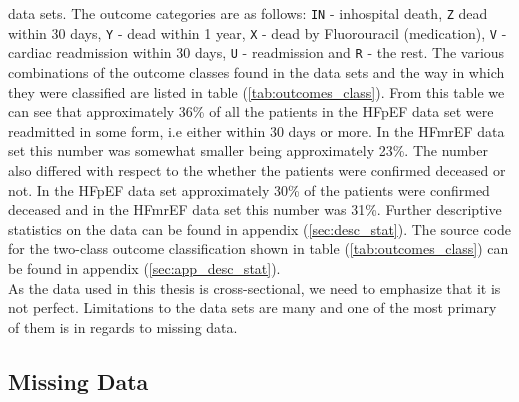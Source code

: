 \documentclass[../thesis.tex]{subfiles}
\begin{document}
\noindent data sets. The outcome categories are as follows: \texttt{IN} - inhospital death, \texttt{Z} \noindent dead within 30 days, \texttt{Y} - dead within 1 year, \texttt{X} - dead by Fluorouracil (medication), \texttt{V} - cardiac readmission within 30 days, \texttt{U} - readmission and \texttt{R} - the rest. The various combinations of the outcome classes found in the data sets and the way in which they were classified are listed in table (\ref{tab:outcomes_class}). From this table we can see that approximately 36\% of all the patients in the HFpEF data set were readmitted in some form, i.e either within 30 days or more. In the HFmrEF data set this number was somewhat smaller being approximately 23\%. The number also differed with respect to the whether the patients were confirmed deceased or not. In the HFpEF data set approximately 30\% of the patients were confirmed deceased and in the HFmrEF data set this number was 31\%. Further descriptive statistics on the data can be found in appendix (\ref{sec:desc_stat}). The source code for the two-class outcome classification shown in table (\ref{tab:outcomes_class}) can be found in appendix (\ref{sec:app_desc_stat}).\\
\indent As the data used in this thesis is cross-sectional, we need to emphasize that it is not perfect. Limitations to the data sets are many and one of the most primary of them is in regards to missing data.


\subsection{Missing Data}
\label{subsec:miss_data}
\end{document}
